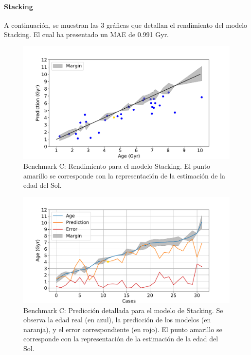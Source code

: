 \paragraph{Stacking} 
A continuación, se muestran las 3 gráficas que detallan el rendimiento del modelo Stacking. El cual ha presentado un MAE de 0.991 Gyr.

\begin{figure}[H]
\begin{center}
 \includegraphics[width=0.8\linewidth]{Figuras/Experimentos/B_C_stacking_1.pdf}
\end{center}
\caption{Benchmark C: Rendimiento para el modelo Stacking. El punto amarillo se corresponde con la representación de la estimación de la edad del Sol.}
 \label{fig:benchC_details_stacking_1}
\end{figure}

\begin{figure}[H]
\begin{center}
 \includegraphics[width=0.8\linewidth]{Figuras/Experimentos/B_C_stacking_2.pdf}
\end{center}
\caption{Benchmark C: Predicción detallada para el modelo de Stacking. Se observa la edad real (en azul), la predicción de los modelos (en naranja), y el error correspondiente (en rojo). El punto amarillo se corresponde con la representación de la estimación de la edad del Sol.}
 \label{fig:benchC_details_stacking_2}
\end{figure}

